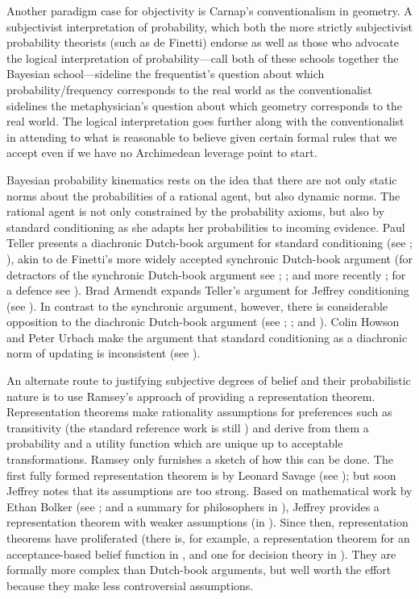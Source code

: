 \documentclass[phd,12pt,oneside]{ubcthesis}
\begin{document}
Another paradigm case for objectivity is Carnap's conventionalism in
geometry. A subjectivist interpretation of probability, which both the
more strictly subjectivist probability theorists (such as de Finetti)
endorse as well as those who advocate the logical interpretation of
probability---call both of these schools together the Bayesian
school---sideline the frequentist's question about which
probability/frequency corresponds to the real world as the
conventionalist sidelines the metaphysician's question about which
geometry corresponds to the real world. The logical interpretation
goes further along with the conventionalist in attending to what is
reasonable to believe given certain formal rules that we accept even
if we have no Archimedean leverage point to start.

Bayesian probability kinematics rests on the idea that there are not
only static norms about the probabilities of a rational agent, but
also dynamic norms. The rational agent is not only constrained by the
probability axioms, but also by standard conditioning as she adapts
her probabilities to incoming evidence. Paul Teller presents a
diachronic Dutch-book argument for standard conditioning (see
; ), akin to de Finetti's
more widely accepted synchronic Dutch-book argument (for detractors of
the synchronic Dutch-book argument see ;
; and more recently
; for a defence see ).
Brad Armendt expands Teller's argument for Jeffrey conditioning (see
). In contrast to the synchronic argument,
however, there is considerable opposition to the diachronic Dutch-book
argument (see ; ; and
). Colin Howson and Peter Urbach make the argument
that standard conditioning as a diachronic norm of updating is
inconsistent (see ).

An alternate route to justifying subjective degrees of belief and
their probabilistic nature is to use Ramsey's approach of providing a
representation theorem. Representation theorems make rationality
assumptions for preferences such as transitivity (the standard
reference work is still ) and derive from them a
probability and a utility function which are unique up to acceptable
transformations. Ramsey only furnishes a sketch of how this can be
done. The first fully formed representation theorem is by Leonard
Savage (see ); but soon Jeffrey notes that its
assumptions are too strong. Based on mathematical work by Ethan Bolker
(see ; and a summary for philosophers in
), Jeffrey provides a representation theorem with
weaker assumptions (in ). Since then,
representation theorems have proliferated (there is, for example, a
representation theorem for an acceptance-based belief function in
, and one for decision theory in
). They are formally more complex than Dutch-book
arguments, but well worth the effort because they make less
controversial assumptions.
\end{document}
